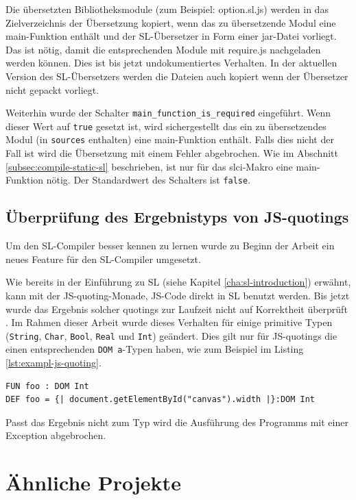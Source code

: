 \documentclass[12pt,bibtotoc]{scrreprt}
\begin{document}
Die übersetzten Bibliotheksmodule (zum Beispiel: option.sl.js) werden in das Zielverzeichnis der Übersetzung kopiert, wenn das zu übersetzende Modul eine main-Funktion enthält und der SL-Übersetzer in Form einer jar-Datei vorliegt. Das ist nötig, damit die entsprechenden Module mit require.js nachgeladen werden können. Dies ist bis jetzt undokumentiertes Verhalten. In der aktuellen Version des SL-Übersetzers werden die Dateien auch kopiert wenn der Übersetzer nicht gepackt vorliegt.

Weiterhin wurde der Schalter \lstinline!main_function_is_required! eingeführt. Wenn dieser Wert auf \lstinline!true! gesetzt ist, wird sichergestellt das ein zu übersetzendes Modul (in \lstinline!sources! enthalten) eine main-Funktion enthält. Falls dies nicht der Fall ist wird die Übersetzung mit einem Fehler abgebrochen. Wie im Abschnitt \ref{subsec:compile-static-sl} beschrieben, ist nur für das slci-Makro eine main-Funktion nötig. Der Standardwert des Schalters ist \lstinline!false!.

\section{Überprüfung des Ergebnistyps von JS-quotings}

Um den SL-Compiler besser kennen zu lernen wurde zu Beginn der Arbeit ein neues Feature für den SL-Compiler umgesetzt.

Wie bereits in der Einführung zu SL (siehe Kapitel \ref{cha:sl-introduction}) erwähnt, kann mit der JS-quoting-Monade, JS-Code direkt in SL benutzt werden. Bis jetzt wurde das Ergebnis solcher quotings zur Laufzeit nicht auf Korrektheit überprüft \cite[S. 29]{Bisping2013}. Im Rahmen dieser Arbeit wurde dieses Verhalten für einige primitive Typen (\lstinline!String!, \lstinline!Char!, \lstinline!Bool!, \lstinline!Real! und \lstinline!Int!) geändert. Dies gilt nur für JS-quotings die einen entsprechenden \lstinline!DOM a!-Typen haben, wie zum Beispiel im Listing \ref{lst:exampl-js-quoting}.

\begin{lstlisting}[caption={Beispiel: JS-quoting-Monade}, label=lst:exampl-js-quoting]
FUN foo : DOM Int
DEF foo = {| document.getElementById("canvas").width |}:DOM Int
\end{lstlisting}

Passt das Ergebnis nicht zum Typ wird die Ausführung des Programms mit einer Exception abgebrochen. 

\chapter{Ähnliche Projekte}
\label{chap:related-works}
\end{document}
